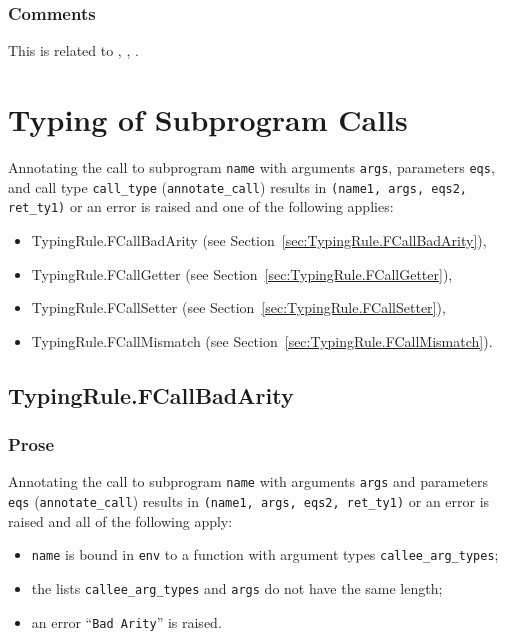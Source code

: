 \documentclass{book}
\begin{document}
\begin{itemize}
\subsection{Comments}
    This is related to , , .

\chapter{Typing of Subprogram Calls \label{ch:TypingSubprogramCalls}}

Annotating the call to subprogram \texttt{name} with arguments \texttt{args},
parameters \texttt{eqs}, and call type \texttt{call\_type} (\texttt{annotate\_call}) results in \texttt{(name1,
args, eqs2, ret\_ty1)} or an error is raised and one of the following applies:
\begin{itemize}
\item TypingRule.FCallBadArity (see Section~\ref{sec:TypingRule.FCallBadArity}),
\item TypingRule.FCallGetter (see Section~\ref{sec:TypingRule.FCallGetter}),
\item TypingRule.FCallSetter (see Section~\ref{sec:TypingRule.FCallSetter}),
\item TypingRule.FCallMismatch (see Section~\ref{sec:TypingRule.FCallMismatch}).
\end{itemize}

\section{TypingRule.FCallBadArity \label{sec:TypingRule.FCallBadArity}}

  \subsection{Prose}
  Annotating the call to subprogram \texttt{name} with arguments \texttt{args}
and parameters \texttt{eqs} (\texttt{annotate\_call}) results in
\texttt{(name1, args, eqs2, ret\_ty1)} or an error is raised and all of the
following apply:
   \begin{itemize}
   \item \texttt{name} is bound in \texttt{env} to a function with argument types \texttt{callee\_arg\_types};
   \item the lists \texttt{callee\_arg\_types} and \texttt{args} do not have the same length;
   \item an error ``\texttt{Bad Arity}'' is raised.
   \end{itemize}


\end{itemize}
\end{document}
